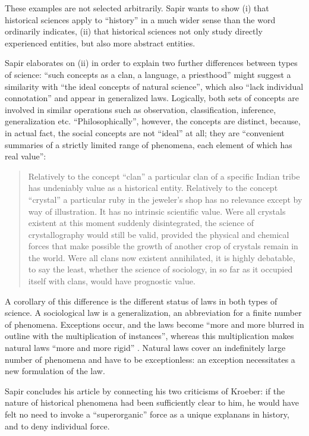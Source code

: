 \documentclass[output=paper]{langscibook}
\begin{document}
These examples are not selected arbitrarily. Sapir wants to show (i) that historical sciences apply to ``history'' in a much wider sense than the word ordinarily indicates, (ii) that historical sciences not only study directly experienced entities, but also more abstract entities.

Sapir elaborates on (ii) in order to explain two further differences between types of science: ``such concepts as a clan, a language, a priesthood'' might suggest a similarity with ``the ideal concepts of natural science'', which also ``lack individual connotation'' and appear in generalized laws. Logically, both sets of concepts are involved in similar operations such as observation, classification, inference, generalization etc. ``Philosophically'', however, the concepts are distinct, because, in actual fact, the social concepts are not ``ideal'' at all; they are ``convenient summaries of a strictly limited range of phenomena, each element of which has real value'':

\begin{quotation}
    Relatively to the concept ``clan'' a particular clan of a specific Indian tribe has undeniably value as a historical entity. Relatively to the concept ``crystal'' a particular ruby in the jeweler's shop has no relevance except by way of illustration. It has no intrinsic scientific value. Were all crystals existent at this moment suddenly disintegrated, the science of crystallography would still be valid, provided the physical and chemical forces that make possible the growth of another crop of crystals remain in the world. Were all clans now existent annihilated, it is highly debatable, to say the least, whether the science of sociology, in so far as it occupied itself with clans, would have prognostic value.
    \citep[446-447]{Sapir1917}
\end{quotation}

A corollary of this difference is the different status of laws in both types of science. A sociological law is a generalization, an abbreviation for a finite number of phenomena. Exceptions occur, and the laws become ``more and more blurred in outline with the multiplication of instances'', whereas this multiplication makes natural laws ``more and more rigid'' \citep[447]{Sapir1917}. Natural laws cover an indefinitely large number of phenomena and have to be exceptionless: an exception necessitates a new formulation of the law.

Sapir concludes his article by connecting his two criticisms of Kroeber: if the nature of historical phenomena had been sufficiently clear to him, he would have felt no need to invoke a ``superorganic'' force as a unique explanans in history, and to deny individual force.
\end{document}
